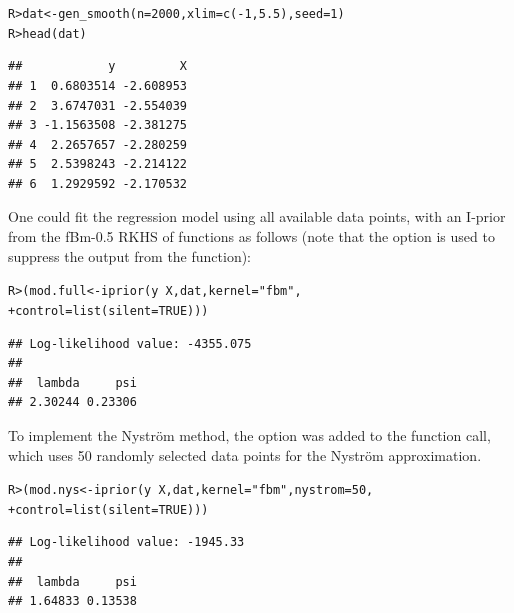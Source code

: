 \documentclass[showframe,11pt,twoside,openright]{report}\usepackage[]{graphicx}\usepackage{xcolor}
\makeatletter
\newcommand{\hlnum}[1]{\textcolor[rgb]{0.063,0.58,0.627}{#1}}%
\newcommand{\hlstr}[1]{\textcolor[rgb]{0.063,0.58,0.627}{#1}}%
\newcommand{\hlopt}[1]{\textcolor[rgb]{0.196,0.196,0.196}{#1}}%
\newcommand{\hlstd}[1]{\textcolor[rgb]{0.196,0.196,0.196}{#1}}%
\newcommand{\hlkwb}[1]{\textcolor[rgb]{0.627,0,0.314}{#1}}%
\newcommand{\hlkwc}[1]{\textcolor[rgb]{0,0.631,0.314}{#1}}%
\newcommand{\hlkwd}[1]{\textcolor[rgb]{0.78,0.227,0.412}{#1}}%
\newenvironment{kframe}{%
 \def\at@end@of@kframe{}%
 \ifinner\ifhmode%
  \def\at@end@of@kframe{\end{minipage}}%
  \begin{minipage}{\columnwidth}%
 \fi\fi%
 \def\FrameCommand##1{\hskip\@totalleftmargin \hskip-\fboxsep
 \colorbox{shadecolor}{##1}\hskip-\fboxsep
     \hskip-\linewidth \hskip-\@totalleftmargin \hskip\columnwidth}%
 \MakeFramed {\advance\hsize-\width
   \@totalleftmargin\z@ \linewidth\hsize
   \@setminipage}}%
 {\par\unskip\endMakeFramed%
 \at@end@of@kframe}
\newenvironment{knitrout}{}{} %
\makeatother
\begin{document}
\begin{knitrout}
\color{fgcolor}\begin{kframe}
\singlespacing\begin{alltt}
\hlstd{R> }\hlstd{dat} \hlkwb{<-} \hlkwd{gen_smooth}\hlstd{(}\hlkwc{n} \hlstd{=} \hlnum{2000}\hlstd{,} \hlkwc{xlim} \hlstd{=} \hlkwd{c}\hlstd{(}\hlopt{-}\hlnum{1}\hlstd{,} \hlnum{5.5}\hlstd{),} \hlkwc{seed} \hlstd{=} \hlnum{1}\hlstd{)}
\hlstd{R> }\hlkwd{head}\hlstd{(dat)}
\end{alltt}
\begin{verbatim}
##            y         X
## 1  0.6803514 -2.608953
## 2  3.6747031 -2.554039
## 3 -1.1563508 -2.381275
## 4  2.2657657 -2.280259
## 5  2.5398243 -2.214122
## 6  1.2929592 -2.170532
\end{verbatim}
\end{kframe}
\end{knitrout}

One could fit the regression model using all available data points, with an I-prior from the fBm-0.5 RKHS of functions as follows (note that the  option is used to suppress the output from the  function):

\begin{knitrout}
\color{fgcolor}\begin{kframe}
\singlespacing\begin{alltt}
\hlstd{R> }\hlstd{(mod.full} \hlkwb{<-} \hlkwd{iprior}\hlstd{(y} \hlopt{~} \hlstd{X, dat,} \hlkwc{kernel} \hlstd{=} \hlstr{"fbm"}\hlstd{,}
\hlstd{+  }                    \hlkwc{control} \hlstd{=} \hlkwd{list}\hlstd{(}\hlkwc{silent} \hlstd{=} \hlnum{TRUE}\hlstd{)))}
\end{alltt}
\begin{verbatim}
## Log-likelihood value: -4355.075 
## 
##  lambda     psi 
## 2.30244 0.23306
\end{verbatim}
\end{kframe}
\end{knitrout}

To implement the Nystr\"om method, the option  was added to the  function call, which uses 50 randomly selected data points for the Nystr\"om approximation.

\begin{knitrout}
\color{fgcolor}\begin{kframe}
\singlespacing\begin{alltt}
\hlstd{R> }\hlstd{(mod.nys} \hlkwb{<-} \hlkwd{iprior}\hlstd{(y} \hlopt{~} \hlstd{X, dat,} \hlkwc{kernel} \hlstd{=} \hlstr{"fbm"}\hlstd{,} \hlkwc{nystrom} \hlstd{=} \hlnum{50}\hlstd{,}
\hlstd{+  }                   \hlkwc{control} \hlstd{=} \hlkwd{list}\hlstd{(}\hlkwc{silent} \hlstd{=} \hlnum{TRUE}\hlstd{)))}
\end{alltt}
\begin{verbatim}
## Log-likelihood value: -1945.33 
## 
##  lambda     psi 
## 1.64833 0.13538
\end{verbatim}
\end{kframe}
\end{knitrout}
\end{document}
